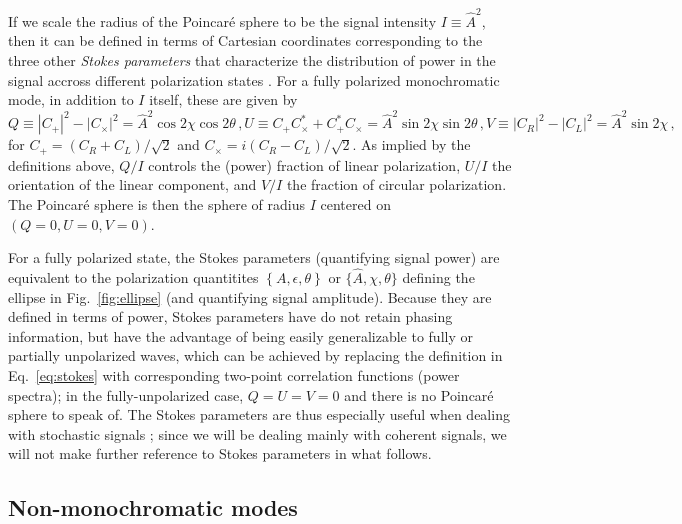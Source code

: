 \documentclass[aps,prd,twocolumn,superscriptaddress,preprintnumbers,floatfix,nofootinbib]{revtex4-2}
\newcommand{\beq}{\begin{equation}}
\newcommand{\eeq}{\end{equation}}
\newcommand*{\eq}[1]{Eq.~\eqref{eq:#1}}
\begin{document}
If we scale the radius of the Poincar\'{e} sphere to be the signal intensity $I \equiv \hat{A}^2$, then it can be defined in terms of Cartesian coordinates corresponding to the three other \emph{Stokes parameters} that characterize the distribution of power in the signal accross different polarization states \cite{Anile1974}.
For a fully polarized monochromatic mode, in addition to $I$ itself, these are given by
\begin{subequations} \label{eq:stokes}
\beq
Q \equiv |C_+|^2 - |C_\times|^2 = \hat{A}^2 \cos 2\chi \cos 2\theta \, , 
\eeq
\beq
U \equiv C_+ C_\times^* + C_+^* C_\times = \hat{A}^2 \sin2\chi \sin 2\theta \,  ,
\eeq
\beq
V \equiv |C_R|^2 - |C_L|^2 = \hat{A}^2 \sin 2\chi \, ,
\eeq 
\end{subequations}
for $C_+ = (C_R + C_L)/\sqrt{2}$ and $C_\times = i (C_R - C_L)/\sqrt{2}$.
As implied by the definitions above, $Q/I$ controls the (power) fraction of linear polarization, $U/I$ the orientation of the linear component, and $V/I$ the fraction of circular polarization.
The Poincar\'{e} sphere is then the sphere of radius $I$ centered on $\left(Q=0, U=0, V=0\right)$.

For a fully polarized state, the Stokes parameters (quantifying signal power) are equivalent to the polarization quantitites $\left\{A, \epsilon, \theta\right\}$ or $\{\hat{A}, \chi, \theta\}$ defining the ellipse in Fig.~\ref{fig:ellipse} (and quantifying signal amplitude).
Because they are defined in terms of power, Stokes parameters have do not retain phasing information, but have the advantage of being easily generalizable to fully or partially unpolarized waves, which can be achieved by replacing the definition in Eq.~\eqref{eq:stokes} with corresponding two-point correlation functions (power spectra); in the fully-unpolarized case, $Q=U=V=0$ and there is no Poincar\'{e} sphere to speak of.
The Stokes parameters are thus especially useful when dealing with stochastic signals \cite{Romano:2016dpx,Conneely:2018wis,Seto:2008sr,Kato:2015bye}; since we will be dealing mainly with coherent signals, we will not make further reference to Stokes parameters in what follows.


\subsection{Non-monochromatic modes}
\label{sec:ellip:gen}
\end{document}
